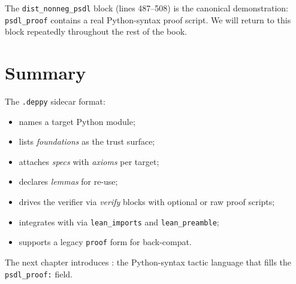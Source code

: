 The \texttt{dist\_nonneg\_psdl} block (lines 487--508) is the
canonical \PSDL{} demonstration: \texttt{psdl\_proof} contains a
real Python-syntax proof script.  We will return to this block
repeatedly throughout the rest of the book.

\section{Summary}
\label{sec:ch5-summary}

The \texttt{.deppy} sidecar format:
\begin{itemize}[leftmargin=1.7em]
  \item names a target Python module;
  \item lists \emph{foundations} as the trust surface;
  \item attaches \emph{specs} with \emph{axioms} per target;
  \item declares \emph{lemmas} for re-use;
  \item drives the verifier via \emph{verify} blocks with optional
    \PSDL{} or raw \Lean{} proof scripts;
  \item integrates with \Lean{} via \texttt{lean\_imports} and
    \texttt{lean\_preamble};
  \item supports a legacy \texttt{proof} form for back-compat.
\end{itemize}

The next chapter introduces \PSDL: the Python-syntax tactic
language that fills the \texttt{psdl\_proof:} field.
